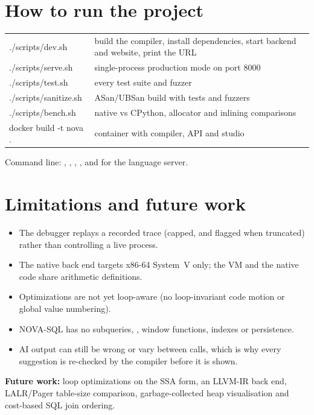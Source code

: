 \documentclass[11pt,a4paper]{article}
\begin{document}
\section{How to run the project}
\begin{center}\small
\begin{tabularx}{\linewidth}{@{}>{\ttfamily}l X@{}}\toprule
./scripts/dev.sh&build the compiler, install dependencies, start backend and website, print the URL\\
./scripts/serve.sh&single-process production mode on port 8000\\
./scripts/test.sh&every test suite and fuzzer\\
./scripts/sanitize.sh&ASan/UBSan build with tests and fuzzers\\
./scripts/bench.sh&native vs CPython, allocator and inlining comparisons\\
docker build -t nova .&container with compiler, API and studio\\\bottomrule
\end{tabularx}
\end{center}
\sloppy Command line: , , , , and  for the language server.

\section{Limitations and future work}
\begin{itemize}
\item The debugger replays a recorded trace (capped, and flagged when truncated) rather than controlling a live process.
\item The native back end targets x86-64 System~V only; the VM and the native code share arithmetic definitions.
\item Optimizations are not yet loop-aware (no loop-invariant code motion or global value numbering).
\item NOVA-SQL has no subqueries, , window functions, indexes or persistence.
\item AI output can still be wrong or vary between calls, which is why every suggestion is re-checked by the compiler before it is shown.
\end{itemize}
\textbf{Future work:} loop optimizations on the SSA form, an LLVM-IR back end, LALR/Pager table-size comparison, garbage-collected heap visualisation and cost-based SQL join ordering.
\end{document}
